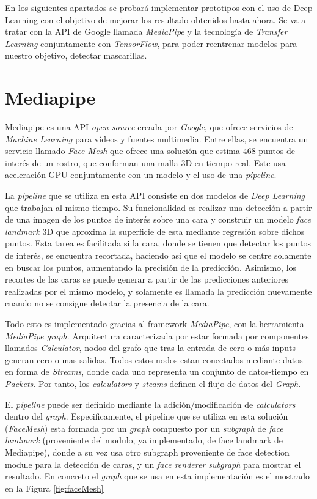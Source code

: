 En los siguientes apartados se probará implementar prototipos con el uso de Deep Learning con el objetivo de mejorar los resultado obtenidos hasta ahora. Se va a tratar con la API de Google llamada \textit{MediaPipe} y la tecnología de \textit{Transfer Learning} conjuntamente con \textit{TensorFlow}, para poder reentrenar modelos para nuestro objetivo, detectar mascarillas.

\newpage
\section{Mediapipe}

Mediapipe es una API \textit{open-source} creada por \textit{Google}, que ofrece servicios de \textit{Machine Learning} para vídeos y fuentes multimedia. Entre ellas, se encuentra un servicio llamado \textit{Face Mesh} que ofrece una solución que estima 468 puntos de interés de un rostro, que conforman una malla 3D en tiempo real. Este usa aceleración GPU conjuntamente con un modelo y el uso de una \textit{pipeline}.

La \textit{pipeline} que se utiliza en esta API consiste en dos modelos de \textit{Deep Learning} que trabajan al mismo tiempo. Su funcionalidad es realizar una detección a partir de una imagen de los puntos de interés sobre una cara y construir un modelo \textit{face landmark} 3D que aproxima la superficie de esta mediante regresión sobre dichos puntos. Esta tarea es facilitada si la cara, donde se tienen que detectar los puntos de interés, se encuentra recortada, haciendo así que el modelo se centre solamente en buscar los puntos, aumentando la precisión de la predicción. Asimismo, los recortes de las caras se puede generar a partir de las predicciones anteriores realizadas por el mismo modelo, y solamente es llamada la predicción nuevamente cuando no se consigue detectar la presencia de la cara.\cite{faceMesh}

Todo esto es implementado gracias al framework \textit{MediaPipe}, con la herramienta \textit{MediaPipe graph}. Arquitectura caracterizada por estar formada por componentes llamados \textit{Calculator}, nodos del grafo que tras la entrada de cero o más inputs generan cero o mas salidas. Todos estos nodos estan conectados mediante datos en forma de \textit{Streams}, donde cada uno representa un conjunto de datos-tiempo en \textit{Packets}. Por tanto, los \textit{calculators} y \textit{steams} definen el flujo de datos del \textit{Graph}. \cite{mediapipe}

El \textit{pipeline} puede ser definido mediante la adición/modificación de \textit{calculators} dentro del \textit{graph}. Especificamente, el pipeline que se utiliza en esta solución (\textit{FaceMesh}) esta formada por un \textit{graph} compuesto por un \textit{subgraph} de \textit{face landmark} (proveniente del modulo, ya implementado, de face landmark de Mediapipe), donde a su vez usa otro subgraph proveniente de face detection module para la detección de caras, y un \textit{face renderer subgraph} para mostrar el resultado. \cite{faceMesh} En concreto el \textit{graph} que se usa en esta implementación es el mostrado en la Figura \ref{fig:faceMesh}

